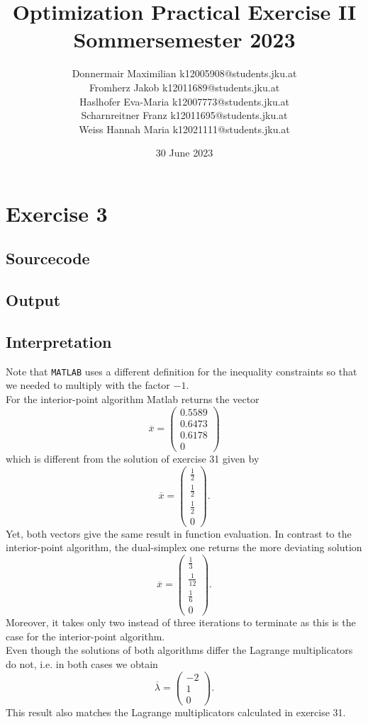 \documentclass{article}
\title{Optimization Practical Exercise II\\ Sommersemester 2023}
\author{Donnermair Maximilian k12005908@students.jku.at\\ Fromherz Jakob k12011689@students.jku.at\\Haslhofer Eva-Maria  k12007773@students.jku.at \\ Scharnreitner Franz k12011695@students.jku.at\\ Weiss Hannah Maria k12021111@students.jku.at } %
\date{30 June 2023}
\begin{document}
	\maketitle
	
	\newpage
	
	\section{Exercise 3}
	\subsection{Sourcecode}
	
	\subsection{Output}
	
	\subsection{Interpretation}
	Note that \texttt{MATLAB} uses a different definition for the inequality constraints so that we needed to multiply with the factor $-1$.\\
	For the interior-point algorithm Matlab returns the vector
	$$ \overline{x} = \begin{pmatrix}
		0.5589\\
		0.6473\\
		0.6178\\
		0
	\end{pmatrix}$$
	which is different from the solution of exercise 31 given by
	$$\overline{x} = \begin{pmatrix}
	\frac{1}{2}\\
	\frac{1}{2}\\
	\frac{1}{2}\\
	0
	\end{pmatrix}.$$
	Yet, both vectors give the same result in function evaluation. In contrast to the interior-point algorithm, the dual-simplex one returns the more deviating solution 
	$$\overline{x} = \begin{pmatrix}
	\frac{1}{3}\\
	\frac{1}{12}\\
	\frac{1}{6}\\
	0
	\end{pmatrix}.$$
	Moreover, it takes only two instead of three iterations to terminate as this is the case for the interior-point algorithm.\\
	Even though the solutions of both algorithms differ the Lagrange multiplicators do not, i.e. in both cases we obtain
	$$ \overline{\lambda} = \begin{pmatrix}
	-2\\
	1\\
	0
	\end{pmatrix}.$$
	This result also matches the Lagrange multiplicators calculated in exercise 31.
	
\end{document}
